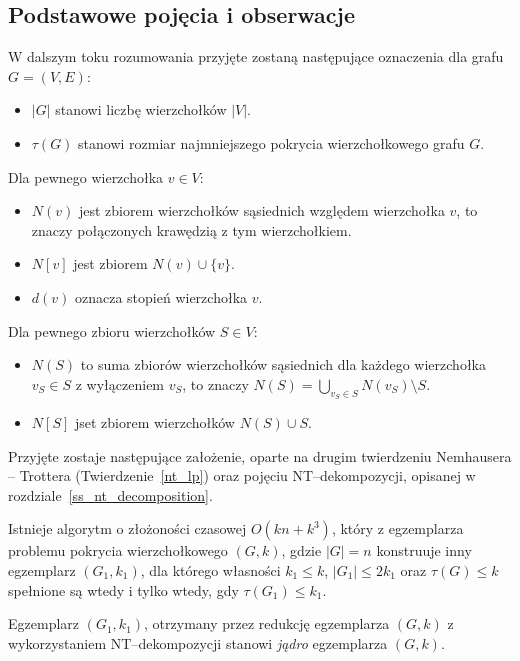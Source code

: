 \subsection{Podstawowe pojęcia i obserwacje}\label{ss_ckx_preliminaries}
\par{
  W dalszym toku rozumowania przyjęte zostaną następujące oznaczenia dla grafu $G=(V, E)$:
  \begin{itemize}
    \item $|G|$ stanowi liczbę wierzchołków $|V|$.
    \item $\tau(G)$ stanowi rozmiar najmniejszego pokrycia wierzchołkowego grafu $G$.
  \end{itemize}
  Dla pewnego wierzchołka $v \in V$:
  \begin{itemize}
    \item $N(v)$ jest zbiorem wierzchołków sąsiednich względem wierzchołka $v$, to znaczy połączonych krawędzią z tym wierzchołkiem.
    \item $N[v]$ jest zbiorem $N(v) \cup \{v\}$.
    \item $d(v)$ oznacza stopień wierzchołka $v$.
  \end{itemize}
  Dla pewnego zbioru wierzchołków $S \in V$:
  \begin{itemize}
    \item $N(S)$ to suma zbiorów wierzchołków sąsiednich dla każdego wierzchołka $v_S \in S$ z wyłączeniem $v_S$, to znaczy $N(S)=\bigcup_{v_S\in S}N(v_S) \setminus S$.
    \item $N[S]$ jset zbiorem wierzchołków $N(S) \cup S$.
  \end{itemize}

  Przyjęte zostaje następujące założenie, oparte na drugim twierdzeniu Nemhausera -- Trottera (Twierdzenie~\ref{nt_lp}) oraz pojęciu NT--dekompozycji, opisanej w rozdziale~\ref{ss_nt_decomposition}.
  \begin{proposition}
    Istnieje algorytm o złożoności czasowej $O(kn + k^3)$, który z egzemplarza problemu pokrycia wierzchołkowego $(G, k)$, gdzie $|G|=n$ konstruuje inny egzemplarz $(G_1, k_1)$, dla którego własności $k_1 \leq k$, $|G_1| \leq 2k_1$ oraz $\tau(G) \leq k$ spełnione są wtedy i tylko wtedy, gdy $\tau(G_1) \leq k_1$.
  \end{proposition}

  \begin{definition}
    Egzemplarz $(G_1, k_1)$, otrzymany przez redukcję egzemplarza $(G, k)$ z wykorzystaniem NT--dekompozycji stanowi \emph{jądro} egzemplarza $(G, k)$.
  \end{definition}
}
